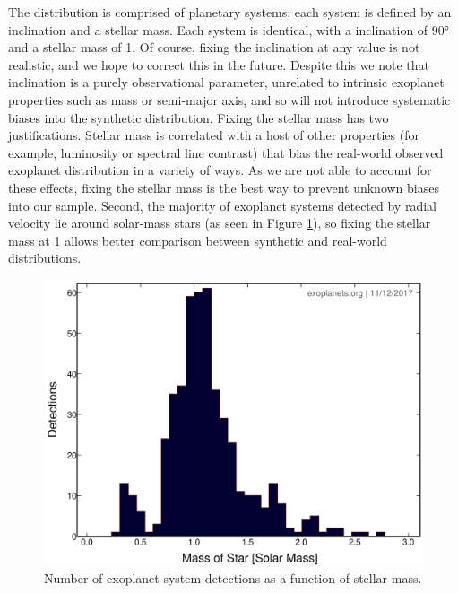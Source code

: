 \documentclass[12pt,manuscript]{aastex}
\begin{document}
The distribution is comprised of planetary systems; each system is defined by an inclination and a stellar mass. 
Each system is identical, with a inclination of \ang{90} and a stellar mass of \SI{1}{\Msun}.
Of course, fixing the inclination at any value is not realistic, and we hope to correct this in the future. 
Despite this we note that inclination is a purely observational parameter, unrelated to intrinsic exoplanet properties such as mass or semi-major axis, and so will not introduce systematic biases into the synthetic distribution.
Fixing the stellar mass has two justifications.
Stellar mass is correlated with a host of other properties (for example, luminosity or spectral line contrast) that bias the real-world observed exoplanet distribution in a variety of ways. 
As we are not able to account for these effects, fixing the stellar mass is the best way to prevent unknown biases into our sample. 
Second, the majority of exoplanet systems detected by radial velocity lie around solar-mass stars (as seen in Figure \ref{fig: solar mass}), so fixing the stellar mass at \SI{1}{\Msun} allows better comparison between synthetic and real-world distributions.

\begin{figure}
  \centering
  \includegraphics[width=0.5\linewidth]{../figures/solar_mass_detections}
  \caption{Number of exoplanet system detections as a function of stellar mass.}
  \label{fig: solar mass}
\end{figure}
\end{document}
